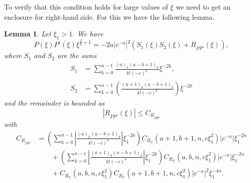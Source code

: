 \documentclass[11pt]{article}
\newcommand{\conj}[1]{\overline{#1}}
\newtheorem{lemma}[definition]{Lemma}
\begin{document}
To verify that this condition holds for large values of \(\xi\) we
need to get an enclosure for right-hand side. For this we have the
following lemma.

\begin{lemma}\label{lemma:real-P-P-dxi-expansion}
  Let \(\xi_{1} > 1\). We have
  \begin{equation*}
    P(\xi)\conj{P'(\xi)}\xi^{\frac{2}{\sigma} + 1}
    = -2a|c^{-a}|^{2}(S_{1}(\xi)S_{2}(\xi) + R_{P\conj{P'}}(\xi)),
  \end{equation*}
  where \(S_{1}\) and \(S_{2}\) are the sums
  \begin{align*}
    S_{1} &= \sum_{k = 0}^{n - 1} \frac{(a)_{k}(a - b + 1)_{k}}{k!(-c)^{k}}\xi^{-2k},\\
    S_{2} &= \sum_{k = 0}^{n - 1} \conj{\left(\frac{(a + 1)_{k}(a - b + 1)_{k}}{k!(-c)^{k}}\right)}\xi^{-2k}
  \end{align*}
  and the remainder is bounded as
  \begin{equation*}
    |R_{P\conj{P'}}(\xi)| \leq C_{R_{P\conj{P'}}}
  \end{equation*}
  with
  \begin{align*}
    C_{R_{P\conj{P'}}}
    &= \left(\sum_{k = 0}^{n - 1} \left|\frac{(a)_{k}(a - b + 1)_{k}}{k!(-c)^{k}}\right|\xi_{1}^{-2k}\right)C_{R_{U}}(a + 1, b + 1, n, c\xi_{1}^{2})|c^{-n}|\xi_{1}^{-2n}\\
      &\qquad+ \left(\sum_{k = 0}^{n - 1} \left|\frac{(a + 1)_{k}(a - b + 1)_{k}}{k!(-c)^{k}}\right|\xi_{1}^{-2k}\right)C_{R_{U}}(a, b, n, c\xi_{1}^{2})|c^{-n}|\xi_{1}^{-2n}\\
    &\qquad+ C_{R_{U}}(a, b, n, c\xi_{1}^{2})C_{R_{U}}(a + 1, b + 1, n, c\xi_{1}^{2})|c^{-n}|^{2}\xi_{1}^{-4n}.
  \end{align*}
\end{lemma}
\end{document}
